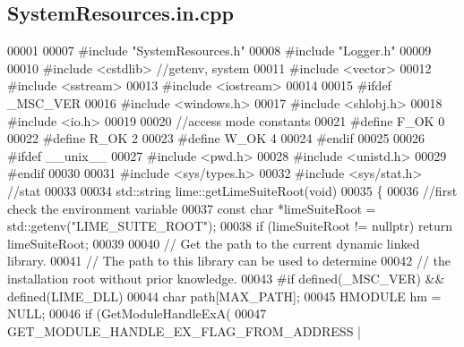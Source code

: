 \subsection{System\+Resources.\+in.\+cpp}
\label{SystemResources_8in_8cpp_source}

\begin{DoxyCode}
00001 
00007 \textcolor{preprocessor}{#include "SystemResources.h"}
00008 \textcolor{preprocessor}{#include "Logger.h"}
00009 
00010 \textcolor{preprocessor}{#include <cstdlib>} \textcolor{comment}{//getenv, system}
00011 \textcolor{preprocessor}{#include <vector>}
00012 \textcolor{preprocessor}{#include <sstream>}
00013 \textcolor{preprocessor}{#include <iostream>}
00014 
00015 \textcolor{preprocessor}{#ifdef \_MSC\_VER}
00016 \textcolor{preprocessor}{#include <windows.h>}
00017 \textcolor{preprocessor}{#include <shlobj.h>}
00018 \textcolor{preprocessor}{#include <io.h>}
00019 
00020 \textcolor{comment}{//access mode constants}
00021 \textcolor{preprocessor}{#define F\_OK 0}
00022 \textcolor{preprocessor}{#define R\_OK 2}
00023 \textcolor{preprocessor}{#define W\_OK 4}
00024 \textcolor{preprocessor}{#endif}
00025 
00026 \textcolor{preprocessor}{#ifdef \_\_unix\_\_}
00027 \textcolor{preprocessor}{#include <pwd.h>}
00028 \textcolor{preprocessor}{#include <unistd.h>}
00029 \textcolor{preprocessor}{#endif}
00030 
00031 \textcolor{preprocessor}{#include <sys/types.h>}
00032 \textcolor{preprocessor}{#include <sys/stat.h>} \textcolor{comment}{//stat}
00033 
00034 std::string lime::getLimeSuiteRoot(\textcolor{keywordtype}{void})
00035 \{
00036     \textcolor{comment}{//first check the environment variable}
00037     \textcolor{keyword}{const} \textcolor{keywordtype}{char} *limeSuiteRoot = std::getenv(\textcolor{stringliteral}{"LIME\_SUITE\_ROOT"});
00038     \textcolor{keywordflow}{if} (limeSuiteRoot != \textcolor{keyword}{nullptr}) \textcolor{keywordflow}{return} limeSuiteRoot;
00039 
00040     \textcolor{comment}{// Get the path to the current dynamic linked library.}
00041     \textcolor{comment}{// The path to this library can be used to determine}
00042     \textcolor{comment}{// the installation root without prior knowledge.}
00043 \textcolor{preprocessor}{    #if defined(\_MSC\_VER) && defined(LIME\_DLL)}
00044     \textcolor{keywordtype}{char} path[MAX\_PATH];
00045     HMODULE hm = NULL;
00046     \textcolor{keywordflow}{if} (GetModuleHandleExA(
00047         GET\_MODULE\_HANDLE\_EX\_FLAG\_FROM\_ADDRESS |

\end{DoxyCode}
